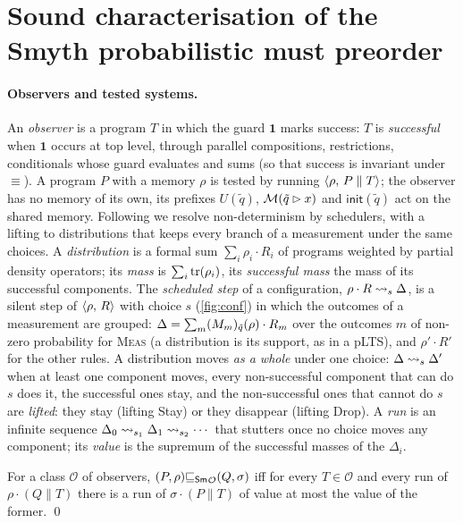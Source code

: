 \section{Sound characterisation of the Smyth probabilistic must preorder}\label{app:smyth}\label{sec:must}

\paragraph{Observers and tested systems.} An \emph{observer} is a program $T$
in which the guard $\mathbf{1}$ marks success: $T$ is \emph{successful} when
$\mathbf{1}$ occurs at top level, through parallel compositions,
restrictions, conditionals whose guard evaluates and sums (so that success
is invariant under $\equiv$). A program $P$ with a memory $\rho$ is tested
by running $\langle \rho ,\, P \parallel T \rangle$; the observer has no memory of its
own, its prefixes $U(\tilde q)$, $\mathcal{M}(\tilde q \rhd x)$ and
$\mathsf{init}(\tilde q)$ act on the shared memory. Following
\cite{Ceragioli27} we resolve non-determinism by schedulers, with a lifting
to distributions that keeps every branch of a measurement under the same
choices. A \emph{distribution} is a formal sum $\sum_i \rho_i \cdot R_i$ of
programs weighted by partial density operators; its \emph{mass} is
$\sum_i \mathrm{tr}(\rho_i)$, its \emph{successful mass} the mass of its successful
components. The \emph{scheduled step} of a configuration,
$\rho \cdot R \rightsquigarrow_{s} \Delta$, is a silent step of $\langle \rho ,\, R \rangle$ with
choice $s$ (\cref{fig:conf}) in which the outcomes of a measurement are
grouped: $\Delta = \sum_m (M_m)_{\tilde q}(\rho) \cdot R_m$ over the outcomes $m$ of non-zero
probability for \textsc{Meas} (a distribution is its support, as in a
pLTS), and $\rho' \cdot R'$ for the other rules. A distribution moves \emph{as a whole}
under one choice: $\Delta \rightsquigarrow_{s} \Delta'$ when at least one component
moves, every non-successful component that can do $s$ does it, the
successful ones stay, and the non-successful ones that cannot do $s$ are
\emph{lifted}: they stay (lifting Stay) or they disappear (lifting Drop).
A \emph{run} is an infinite sequence $\Delta_0 \rightsquigarrow_{s_1} \Delta_1
\rightsquigarrow_{s_2} \cdots$ that stutters once no choice moves any component; its
\emph{value} is the supremum of the successful masses of the $\Delta_i$.

\begin{definition}\label{def:smyth}
For a class $\mathcal{O}$ of observers, $(P, \rho) {\sqsubseteq_{\mathsf{Sm}}}_{\mathcal{O}} (Q, \sigma)$
iff for every $T \in \mathcal{O}$ and every run of $\rho \cdot (Q \parallel T)$
there is a run of $\sigma \cdot (P \parallel T)$ of value at most the value
of the former.
\qed
\end{definition}


